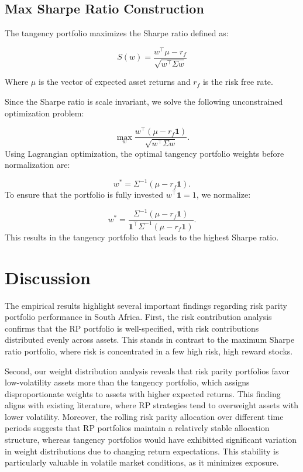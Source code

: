 \documentclass[preprint, 3p,
authoryear]{elsarticle} %
\begin{document}
\hypertarget{max-sharpe-ratio-construction}{%
\subsection{Max Sharpe Ratio
Construction}\label{max-sharpe-ratio-construction}}

The tangency portfolio maximizes the Sharpe ratio defined as:

\[
S(w) = \frac{w^\top\mu-r_f}{\sqrt{w^\top\Sigma{w}}}
\]

Where \(\mu\) is the vector of expected asset returns and \(r_f\) is the
risk free rate.

Since the Sharpe ratio is scale invariant, we solve the following
unconstrained optimization problem:

\[
\max_w \frac{w^\top (\mu - r_f \mathbf{1})}{\sqrt{w^\top \Sigma w}}.
\] Using Lagrangian optimization, the optimal tangency portfolio weights
before normalization are:

\[
w^* = \Sigma^{-1} (\mu - r_f \mathbf{1}).
\] To ensure that the portfolio is fully invested
\(w^\top \mathbf{1} = 1\), we normalize:

\[
w^* = \frac{\Sigma^{-1} (\mu - r_f \mathbf{1})}{\mathbf{1}^\top \Sigma^{-1} (\mu - r_f \mathbf{1})}.
\] This results in the tangency portfolio that leads to the highest
Sharpe ratio.

\hypertarget{discussion}{%
\section{Discussion}\label{discussion}}

The empirical results highlight several important findings regarding
risk parity portfolio performance in South Africa. First, the risk
contribution analysis confirms that the RP portfolio is well-specified,
with risk contributions distributed evenly across assets. This stands in
contrast to the maximum Sharpe ratio portfolio, where risk is
concentrated in a few high risk, high reward stocks.

Second, our weight distribution analysis reveals that risk parity
portfolios favor low-volatility assets more than the tangency portfolio,
which assigns disproportionate weights to assets with higher expected
returns. This finding aligns with existing literature, where RP
strategies tend to overweight assets with lower volatility. Moreover,
the rolling risk parity allocation over different time periods suggests
that RP portfolios maintain a relatively stable allocation structure,
whereas tangency portfolios would have exhibitted significant variation
in weight distributions due to changing return expectations. This
stability is particularly valuable in volatile market conditions, as it
minimizes exposure.
\end{document}

